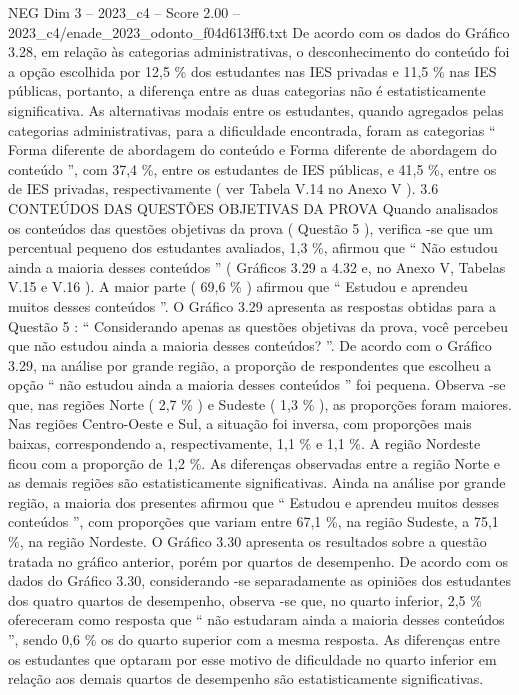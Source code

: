 \begin{textsample}{NEG Dim 3 – 2023\_c4 – Score 2.00 – 2023\_c4/enade\_2023\_odonto\_f04d613ff6.txt}
De acordo com os dados do Gráfico 3.28, em relação às categorias administrativas, o desconhecimento do conteúdo foi a opção escolhida por 12,5 \% dos estudantes nas IES privadas e 11,5 \% nas IES públicas, portanto, a diferença entre as duas categorias não é estatisticamente significativa.
As alternativas modais entre os estudantes, quando agregados pelas categorias administrativas, para a dificuldade encontrada, foram as categorias “ Forma diferente de abordagem do conteúdo e Forma diferente de abordagem do conteúdo ”, com 37,4 \%, entre os estudantes de IES públicas, e 41,5 \%, entre os de IES privadas, respectivamente ( ver Tabela V.14 no Anexo V ). 3.6 CONTEÚDOS DAS QUESTÕES OBJETIVAS DA PROVA Quando analisados os conteúdos das questões objetivas da prova ( Questão 5 ), verifica -se que um percentual pequeno dos estudantes avaliados, 1,3 \%, afirmou que “ Não estudou ainda a maioria desses conteúdos ” ( Gráficos 3.29 a 4.32 e, no Anexo V, Tabelas V.15 e V.16 ).
A maior parte ( 69,6 \% ) afirmou que “ Estudou e aprendeu muitos desses conteúdos ”.
O Gráfico 3.29 apresenta as respostas obtidas para a Questão 5 : “ Considerando apenas as questões objetivas da prova, você percebeu que não estudou ainda a maioria desses conteúdos? ”.
De acordo com o Gráfico 3.29, na análise por grande região, a proporção de respondentes que escolheu a opção “ não estudou ainda a maioria desses conteúdos ” foi pequena.
Observa -se que, nas regiões Norte ( 2,7 \% ) e Sudeste ( 1,3 \% ), as proporções foram maiores.
Nas regiões Centro-Oeste e Sul, a situação foi inversa, com proporções mais baixas, correspondendo a, respectivamente, 1,1 \% e 1,1 \%.
A região Nordeste ficou com a proporção de 1,2 \%.
As diferenças observadas entre a região Norte e as demais regiões são estatisticamente significativas.
Ainda na análise por grande região, a maioria dos presentes afirmou que “ Estudou e aprendeu muitos desses conteúdos ”, com proporções que variam entre 67,1 \%, na região Sudeste, a 75,1 \%, na região Nordeste.
O Gráfico 3.30 apresenta os resultados sobre a questão tratada no gráfico anterior, porém por quartos de desempenho.
De acordo com os dados do Gráfico 3.30, considerando -se separadamente as opiniões dos estudantes dos quatro quartos de desempenho, observa -se que, no quarto inferior, 2,5 \% ofereceram como resposta que “ não estudaram ainda a maioria desses conteúdos ”, sendo 0,6 \% os do quarto superior com a mesma resposta.
As diferenças entre os estudantes que optaram por esse motivo de dificuldade no quarto inferior em relação aos demais quartos de desempenho são estatisticamente significativas.

\end{textsample}
